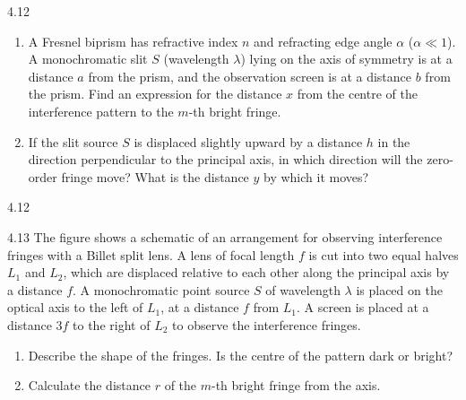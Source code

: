 \begin{problem}{4.12}
\begin{enumerate}[label=(\arabic*),leftmargin=2.2em,itemsep=2pt,topsep=2pt]
\item A Fresnel biprism has refractive index $n$ and refracting edge angle $\alpha$ ($\alpha\ll 1$). A monochromatic slit $S$ (wavelength $\lambda$) lying on the axis of symmetry is at a distance $a$ from the prism, and the observation screen is at a distance $b$ from the prism. Find an expression for the distance $x$ from the centre of the interference pattern to the $m$-th bright fringe.
\item If the slit source $S$ is displaced slightly upward by a distance $h$ in the direction perpendicular to the principal axis, in which direction will the zero-order fringe move? What is the distance $y$ by which it moves?
\end{enumerate}
\end{problem}

\begin{figbox}{4.12}
\end{figbox}

\begin{problem}{4.13}
The figure shows a schematic of an arrangement for observing interference fringes with a Billet split lens. A lens of focal length $f$ is cut into two equal halves $L_1$ and $L_2$, which are displaced relative to each other along the principal axis by a distance $f$. A monochromatic point source $S$ of wavelength $\lambda$ is placed on the optical axis to the left of $L_1$, at a distance $f$ from $L_1$. A screen is placed at a distance $3f$ to the right of $L_2$ to observe the interference fringes.
\begin{enumerate}[label=(\arabic*),leftmargin=2.2em,itemsep=1pt,topsep=2pt]
\item Describe the shape of the fringes. Is the centre of the pattern dark or bright?
\item Calculate the distance $r$ of the $m$-th bright fringe from the axis.
\end{enumerate}
\end{problem}

